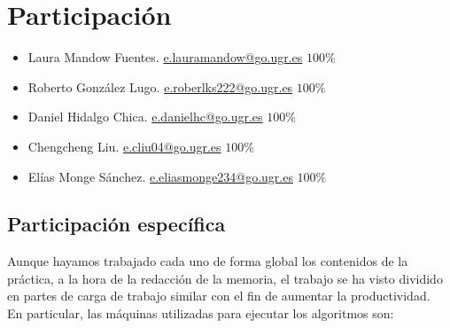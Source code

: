 \documentclass{article}
\newcommand{\email}[1]{\href{mailto:#1}{{{\color{blue}#1}}}}
\begin{document}

    
    

    \newpage

    
\section{Participación}
    \begin{itemize}
        \item Laura Mandow Fuentes. \email{e.lauramandow@go.ugr.es}  $100\%$
        \item Roberto González Lugo. \email{e.roberlks222@go.ugr.es}  $100\%$
        \item Daniel Hidalgo Chica. \email{e.danielhc@go.ugr.es}  $100\%$
        \item Chengcheng Liu. \email{e.cliu04@go.ugr.es} $100\%$
        \item Elías Monge Sánchez. \email{e.eliasmonge234@go.ugr.es}  $100\%$
    \end{itemize}
    \subsection{Participación específica}
    Aunque hayamos trabajado cada uno de forma global los contenidos de la práctica, a la hora de la redacción de la memoria, el trabajo se ha visto dividido en partes de carga de trabajo similar con el fin de aumentar la productividad.
    \\
    En particular, las máquinas utilizadas para ejecutar los algoritmos son:
\end{document}
